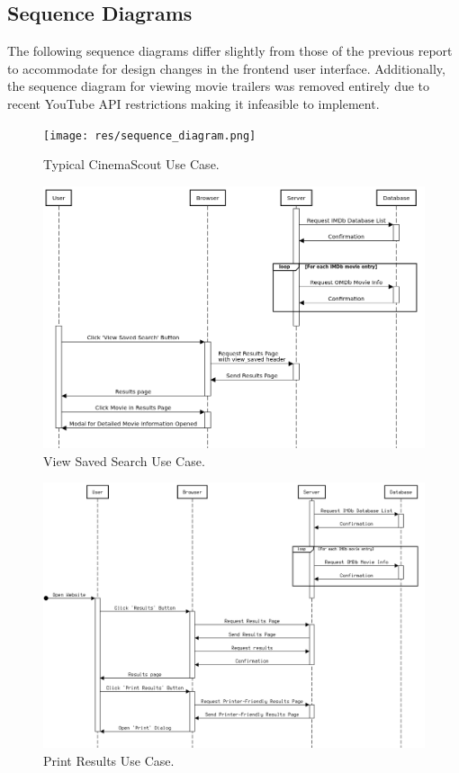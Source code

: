 \documentclass{article}
\begin{document}
\subsection{Sequence Diagrams}
The following sequence diagrams differ slightly from those of the previous
report to accommodate for design changes in the frontend user interface. 
Additionally, the sequence diagram for viewing movie trailers was removed 
entirely due to recent YouTube API restrictions making it infeasible to
implement.
\begin{figure}[H]
\texttt{[image: res/sequence\_diagram.png]}
\caption{Typical CinemaScout Use Case.}
\end{figure}
\begin{figure}[H]
\includegraphics[width=\columnwidth]{res/sequence_diagram2.png}
\caption{View Saved Search Use Case.}
\end{figure}
\begin{figure}[H]
\includegraphics[width=\columnwidth]{res/sequence_diagram5.png}
\caption{Print Results Use Case.}
\end{figure}
\end{document}
